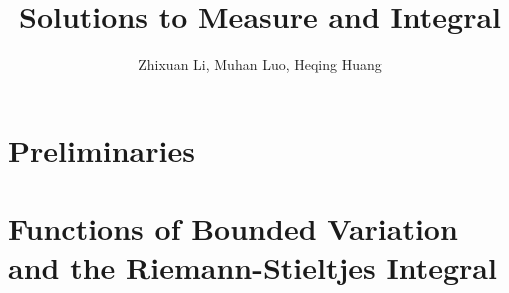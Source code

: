 \documentclass[11pt]{article}
\theoremstyle{definition}
\begin{document}
  \title{Solutions to Measure and Integral}
  \author{Zhixuan Li, Muhan Luo, Heqing Huang}
  \maketitle

  \section{Preliminaries}

  \section{Functions of Bounded Variation and the Riemann-Stieltjes Integral}
  
\end{document}
